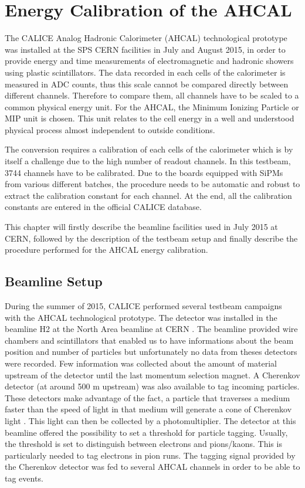 \chapter{Energy Calibration of the AHCAL}
\label{chap:ECalibAHCAL}

The CALICE Analog Hadronic Calorimeter (AHCAL) technological prototype was installed at the SPS CERN facilities in July and August 2015, in order to provide energy and time measurements of electromagnetic and hadronic showers using plastic scintillators. The data recorded in each cells of the calorimeter is measured in ADC counts, thus this scale cannot be compared directly between different channels. Therefore to compare them, all channels have to be scaled to a common physical energy unit. For the AHCAL, the Minimum Ionizing Particle or MIP unit is chosen. This unit relates to the cell energy in a well and understood physical process almost independent to outside conditions.

The conversion requires a calibration of each cells of the calorimeter which is by itself a challenge due to the high number of readout channels. In this testbeam, 3744 channels have to be calibrated. Due to the boards equipped with SiPMs from various different batches, the procedure needs to be automatic and robust to extract the calibration constant for each channel. At the end, all the calibration constants are entered in the official CALICE database.

This chapter will firstly describe the beamline facilities used in July 2015 at CERN, followed by the description of the testbeam setup and finally describe the procedure performed for the AHCAL energy calibration.

\section{Beamline Setup}
\label{sec:beamline}

During the summer of 2015, CALICE performed several testbeam campaigns with the AHCAL technological prototype. The detector was installed in the beamline H2 at the North Area beamline at CERN \cite{H2Beamline}. The beamline provided wire chambers and scintillators that enabled us to have informations about the beam position and number of particles but unfortunately no data from theses detectors were recorded. Few information was collected about the amount of material upstream of the detector until the last momentum selection magnet. A Cherenkov detector (at around 500 m upstream) was also available to tag incoming particles. These detectors make advantage of the fact, a particle that traverses a medium faster than the speed of light in that medium will generate a cone of Cherenkov light \cite{GOVORKOV20059}. This light can then be collected by a photomultiplier. The detector at this beamline offered the possibility to set a threshold for particle tagging. Usually, the threshold is set to distinguish between electrons and pions/kaons. This is particularly needed to tag electrons in pion runs. The tagging signal provided by the Cherenkov detector was fed to several AHCAL channels in order to be able to tag events.\\

